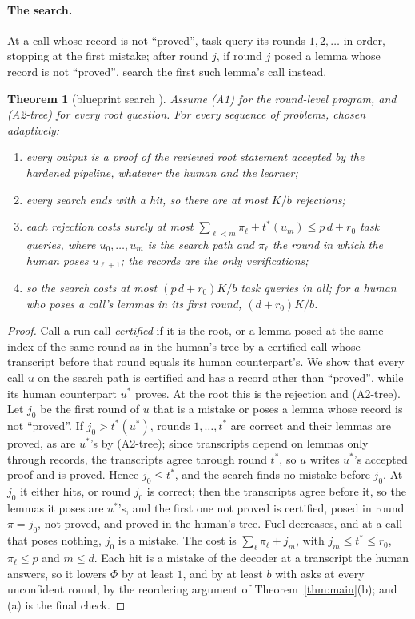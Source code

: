 \documentclass[11pt]{article}
\newtheorem{theorem}{Theorem}[section]
\theoremstyle{definition}
\theoremstyle{remark}
\newcommand{\K}{K}
\begin{document}
\paragraph{The search.} At a call whose record is not ``proved'', task-query its rounds $1,2,\dots$ in order, stopping at the first mistake; after round $j$, if round $j$ posed a lemma whose record is not ``proved'', search the first such lemma's call instead.

\begin{theorem}[blueprint search \cite{threadY}]\label{thm:tree}
Assume (A1) for the round-level program, and (A2-tree) for every root question. For every sequence of problems, chosen adaptively:
\begin{enumerate}[label=(\alph*),nosep]
\item every output is a proof of the reviewed root statement accepted by the hardened pipeline, whatever the human and the learner;
\item every search ends with a hit, so there are at most $\K/b$ rejections;
\item each rejection costs surely at most $\sum_{\ell<m}\pi_\ell+t^*(u_m)\le p\,d+r_0$ task queries, where $u_0,\dots,u_m$ is the search path and $\pi_\ell$ the round in which the human poses $u_{\ell+1}$; the records are the only verifications;
\item so the search costs at most $(p\,d+r_0)\K/b$ task queries in all; for a human who poses a call's lemmas in its first round, $(d+r_0)\K/b$.
\end{enumerate}
\end{theorem}
\begin{proof}
Call a run call \emph{certified} if it is the root, or a lemma posed at the same index of the same round as in the human's tree by a certified call whose transcript before that round equals its human counterpart's. We show that every call $u$ on the search path is certified and has a record other than ``proved'', while its human counterpart $u^*$ proves. At the root this is the rejection and (A2-tree). Let $j_0$ be the first round of $u$ that is a mistake or poses a lemma whose record is not ``proved''. If $j_0>t^*(u^*)$, rounds $1,\dots,t^*$ are correct and their lemmas are proved, as are $u^*$'s by (A2-tree); since transcripts depend on lemmas only through records, the transcripts agree through round $t^*$, so $u$ writes $u^*$'s accepted proof and is proved. Hence $j_0\le t^*$, and the search finds no mistake before $j_0$. At $j_0$ it either hits, or round $j_0$ is correct; then the transcripts agree before it, so the lemmas it poses are $u^*$'s, and the first one not proved is certified, posed in round $\pi=j_0$, not proved, and proved in the human's tree. Fuel decreases, and at a call that poses nothing, $j_0$ is a mistake. The cost is $\sum_\ell\pi_\ell+j_m$, with $j_m\le t^*\le r_0$, $\pi_\ell\le p$ and $m\le d$. Each hit is a mistake of the decoder at a transcript the human answers, so it lowers $\Phi$ by at least $1$, and by at least $b$ with asks at every unconfident round, by the reordering argument of Theorem~\ref{thm:main}(b); and (a) is the final check.
\end{proof}
\end{document}
